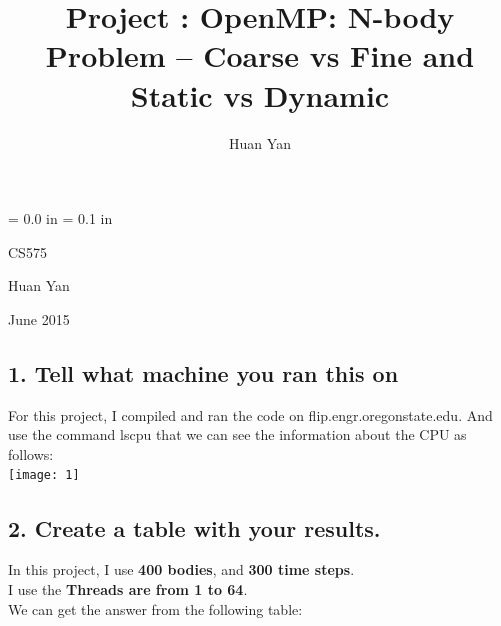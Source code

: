 \documentclass[a4paper,12pt]{article}
\begin{document}
\setlength\parskip{ \baselineskip}
\title{Project : OpenMP: N-body Problem -- Coarse vs Fine and Static vs Dynamic}
\setlength\parskip{ \baselineskip}
\author{
	Huan Yan
}

\maketitle
\newpage
\renewcommand{\headrulewidth}{1pt}
\renewcommand{\labelitemii}{$\bullet$}
\def\course{CS575}
\def\name{Huan Yan}
\def\data{June 2015}

\parindent = 0.0 in
\parskip = 0.1 in


\hfill \course


\hfill \name


\hfill \data


\subsection*{ 1. Tell what machine you ran this on}

For this project, I compiled and ran the code on flip.engr.oregonstate.edu.  And use the command lscpu that we can see the information about the CPU as follows:\\

\texttt{[image: 1]}

\subsection*{2. Create a table with your results.}

In this project, I use \textbf{400 bodies}, and \textbf{300 time steps}.\\

I use the \textbf{Threads are from 1 to 64}.\\

We can get the answer from the following table:\\
\end{document}
